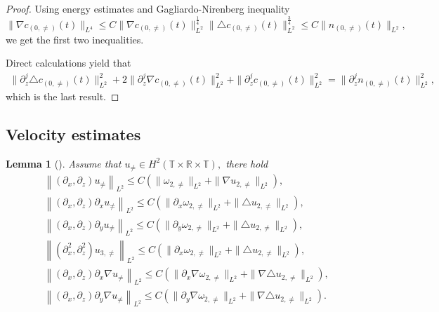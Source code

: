 \documentclass[12pt, reqno]{amsart}
\newtheorem{lemma}{Lemma}[section]
\numberwithin{equation}{section}
\begin{document}
	\begin{proof}
		Using energy estimates and Gagliardo-Nirenberg inequality
		$$\|\nabla c_{(0,\neq )}(t)\|_{L^4}\leq C\|\nabla c_{(0,\neq )}(t)\|_{L^2}^{\frac14}\|\triangle c_{(0,\neq )}(t)\|_{L^2}^{\frac34} 
		\leq C\|n_{(0,\neq )}(t)\|_{L^2},$$
		we  get the first two inequalities.
		
		Direct calculations yield that 
		\begin{align*}
			\|\partial_z^j\triangle c_{(0,\neq )}(t)\|^2_{L^2}
			+2\|\partial_z^j\nabla c_{(0,\neq )}(t)\|^2_{L^2}
			+\|\partial_z^j c_{(0,\neq )}(t)\|^2_{L^2}
			=\|\partial_z^j n_{(0,\neq )}(t)\|^2_{L^2},
		\end{align*}
		which is the last result.
	\end{proof}
	
	\subsection{Velocity estimates}\label{sec_velocty}
	
	\begin{lemma}[]\label{lemma_u}
		Assume that $u_{\neq}\in H^{2}(\mathbb{T}\times\mathbb{R}\times\mathbb{T}),$  there hold
		\begin{equation}\label{eq:velocity embed}
			\begin{aligned}
				&\left\|(\partial_x,
				\partial_z)u_{\neq}\right\|_{L^2}\leq C(\|\omega_{2,\neq}\|_{L^2}
				+\|\nabla u_{2,\neq}\|_{L^2}),\\
				&\left\|(\partial_x,
				\partial_z)\partial_xu_{\neq}\right\|_{L^2}\leq C(\|\partial_x\omega_{2,\neq}\|_{L^2}
				+\|\triangle u_{2,\neq}\|_{L^2}),\\
				&\left\|(\partial_x,
				\partial_z)\partial_yu_{\neq}\right\|_{L^2}\leq C(\|\partial_y\omega_{2,\neq}\|_{L^2}
				+\|\triangle u_{2,\neq}\|_{L^2}),\\
				&\left\|(\partial_x^2,
				\partial_z^2)u_{3,\neq}\right\|_{L^2}
				\leq C(\|\partial_x\omega_{2,\neq}\|_{L^2}
				+\|\triangle u_{2,\neq}\|_{L^2}),\\
				&\left\|(\partial_x,
				\partial_z)\partial_x\nabla u_{\neq}\right\|_{L^2}\leq C(\|\partial_x\nabla\omega_{2,\neq}\|_{L^2}
				+\|\nabla\triangle u_{2,\neq}\|_{L^2}),\\
				&\left\|(\partial_x,
				\partial_z)\partial_y\nabla u_{\neq}\right\|_{L^2}\leq C(\|\partial_y\nabla\omega_{2,\neq}\|_{L^2}
				+\|\nabla\triangle u_{2,\neq}\|_{L^2}).\end{aligned}
		\end{equation}
	\end{lemma}
	
\end{document}

